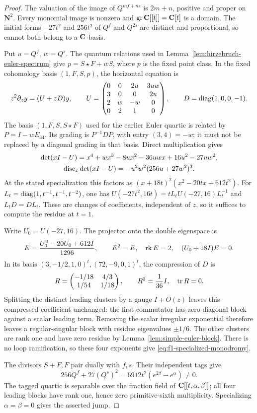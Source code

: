 \begin{proof}
The valuation of the image of \(Q^{mf+ns}\) is \(2m+n\), positive and
proper on \(\mathbf N^2\). Every monomial image is nonzero and
\(\operatorname{gr}\mathbf C[[t]]=\mathbf C[t]\) is a domain. The initial forms
\(-27t^2\) and \(256t^2\) of \(Q^f\) and \(Q^{2s}\) are distinct and
proportional, so cannot both belong to a \(\mathbf C\)-basis.

Put \(u=Q^f\), \(w=Q^s\). The quantum relations used in
Lemma~\ref{lem:hirzebruch-euler-spectrum} give
\(p=S\star F+wS\), where \(p\) is the fixed point class. In the fixed
cohomology basis \((1,F,S,p)\), the horizontal equation is
\[
 z^2\partial_z y=(U+zD)y,\qquad
 U=\begin{pmatrix}
 0&0&2u&3uw\\3&0&0&2u\\2&w&-w&0\\0&2&1&0
 \end{pmatrix},\qquad D=\operatorname{diag}(1,0,0,-1).
\]
The basis \((1,F,S,S\star F)\) used for the earlier Euler quartic is
related by \(P=I-wE_{34}\). Its grading is \(P^{-1}DP\), with entry
\((3,4)=-w\); it must not be replaced by a diagonal grading in that basis.
Direct multiplication gives
\[
 \begin{gathered}
 \det(xI-U)=x^4+wx^3-8ux^2-36uwx+16u^2-27uw^2,\\
 \operatorname{disc}_x\det(xI-U)=-u^2w^2(256u+27w^2)^3.
 \end{gathered}
\]
At the stated specialization this factors as
\((x+18t)^2(x^2-20tx+612t^2)\).
For \(L_t=\operatorname{diag}(1,t^{-1},t^{-1},t^{-2})\), one has
\(U(-27t^2,16t)=tL_tU(-27,16)L_t^{-1}\) and \(L_tD=DL_t\).
These are changes of coefficients, independent of \(z\), so it suffices to
compute the residue at \(t=1\).

Write \(U_0=U(-27,16)\). The projector onto the double eigenspace is
\[
 E=\frac{U_0^2-20U_0+612I}{1296},\qquad
 E^2=E,\quad\operatorname{rk} E=2,\quad (U_0+18I)E=0.
\]
In its basis \((3,-1/2,1,0)^t,(72,-9,0,1)^t\), the compression of
\(D\) is
\[
 R=\begin{pmatrix}-1/18&4/3\\1/54&1/18\end{pmatrix},
 \qquad R^2=\frac1{36}I,\quad\operatorname{tr} R=0.
\]
Splitting the distinct leading clusters by a gauge \(I+O(z)\) leaves this
compressed coefficient unchanged: the first commutator has zero diagonal
block against a scalar leading term. Removing the scalar irregular
exponential therefore leaves a regular-singular block with residue
eigenvalues \(\pm1/6\). The other clusters are rank one and have zero
residue by Lemma~\ref{lem:simple-euler-block}. There is no loop ramification,
so these four exponents give \eqref{eq:f1-specialized-monodromy}.

The divisors \(S+F,F\) pair dually with \(f,s\). Their independent tags give
\[
 256Q^f+27(Q^s)^2
   =6912t^2(e^{2\beta}-e^\alpha)\ne0.
\]
The tagged quartic is separable over the fraction field of
\(\mathbf C[[t,\alpha,\beta]]\); all four leading blocks have rank one, hence
zero primitive-sixth multiplicity. Specializing \(\alpha=\beta=0\) gives
the asserted jump.
%
\end{proof}

